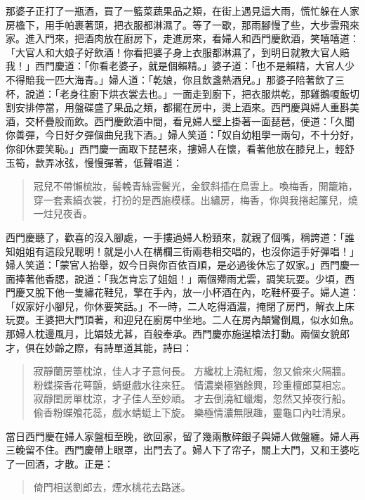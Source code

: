 那婆子正打了一瓶酒，買了一籃菜蔬果品之類，在街上遇見這大雨，慌忙躲在人家房檐下，用手帕裹著頭，把衣服都淋濕了。等了一歇，那雨腳慢了些，大步雲飛來家。進入門來，把酒肉放在廚房下，走進房來，看婦人和西門慶飲酒，笑嘻嘻道：「大官人和大娘子好飲酒！你看把婆子身上衣服都淋濕了，到明日就教大官人賠我！」西門慶道：「你看老婆子，就是個賴精。」婆子道：「也不是賴精，大官人少不得賠我一匹大海青。」婦人道：「乾娘，你且飲盞熱酒兒。」那婆子陪著飲了三杯，說道：「老身往廚下烘衣裳去也。」一面走到廚下，把衣服烘乾，那雞鵝嗄飯切割安排停當，用盤碟盛了果品之類，都擺在房中，燙上酒來。西門慶與婦人重斟美酒，交杯疊股而飲。西門慶飲酒中間，看見婦人壁上掛著一面琵琶，便道：「久聞你善彈，今日好夕彈個曲兒我下酒。」婦人笑道：「奴自幼粗學一兩句，不十分好，你卻休要笑恥。」西門慶一面取下琵琶來，摟婦人在懷，看著他放在膝兒上，輕舒玉筍，款弄冰弦，慢慢彈著，低聲唱道：
\begin{quote}
冠兒不帶懶梳妝，髻輓青絲雲鬢光，金釵斜插在烏雲上。喚梅香，開籠箱，穿一套素縞衣裳，打扮的是西施模樣。出繡房，梅香，你與我捲起簾兒，燒一炷兒夜香。
\end{quote}

西門慶聽了，歡喜的沒入腳處，一手摟過婦人粉頸來，就親了個嘴，稱誇道：「誰知姐姐有這段兒聰明！就是小人在構欄三街兩巷相交唱的，也沒你這手好彈唱！」婦人笑道：「蒙官人抬舉，奴今日與你百依百順，是必過後休忘了奴家。」西門慶一面捧著他香腮，說道：「我怎肯忘了姐姐！」兩個殢雨尤雲，調笑玩耍。少頃，西門慶又脫下他一隻繡花鞋兒，擎在手內，放一小杯酒在內，吃鞋杯耍子。婦人道：「奴家好小腳兒，你休要笑話。」不一時，二人吃得酒濃，掩閉了房門，解衣上床玩耍。王婆把大門頂著，和迎兒在廚房中坐地。二人在房內顛鸞倒鳳，似水如魚。那婦人枕邊風月，比娼妓尤甚，百般奉承。西門慶亦施逞槍法打動。兩個女貌郎才，俱在妙齡之際，有詩單道其能，詩曰：
\begin{quote}
寂靜蘭房簟枕涼，佳人才子意何長。
方纔枕上澆紅燭，忽又偷來火隔牆。
粉蝶探香花萼顫，蜻蜓戲水往來狂。
情濃樂極猶餘興，珍重檀郎莫相忘。
寂靜閨房單枕涼，才子佳人至妙頑。
才去倒澆紅蠟燭，忽然又掉夜行船。
偷香粉蝶飧花蕊，戲水蜻蜓上下旋。
樂極情濃無限趣，靈龜口內吐清泉。
\end{quote}

當日西門慶在婦人家盤桓至晚，欲回家，留了幾兩散碎銀子與婦人做盤纏。婦人再三輓留不住。西門慶帶上眼罩，出門去了。婦人下了帘子，關上大門，又和王婆吃了一回酒，才散。正是：
\begin{quote}
倚門相送劉郎去，煙水桃花去路迷。
\end{quote}
